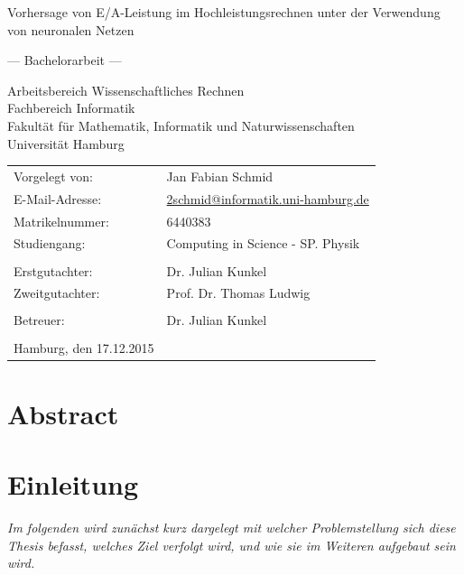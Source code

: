 \documentclass[
	12pt,
	a4paper,
	BCOR10mm,
	DIV14,
	listof=totoc,
	bibliography=totoc,
	headsepline
]{scrreprt}
\begin{document}
\begin{titlepage}
	\begin{center}
		{\titlefont\huge Vorhersage von E/A-Leistung im Hochleistungsrechnen unter der Verwendung von neuronalen Netzen\par}

		\bigskip
		\bigskip

		{\titlefont\Large --- Bachelorarbeit ---\par}

		\bigskip
		\bigskip

		{\large Arbeitsbereich Wissenschaftliches Rechnen\\
		Fachbereich Informatik\\
		Fakultät für Mathematik, Informatik und Naturwissenschaften\\
		Universität Hamburg\par}
	\end{center}

	\vfill

	{\large \begin{tabular}{ll}
		Vorgelegt von: & Jan Fabian Schmid \\
		E-Mail-Adresse: & \href{mailto:2schmid@informatik.uni-hamburg.de}{2schmid@informatik.uni-hamburg.de} \\
		Matrikelnummer: & 6440383 \\
		Studiengang: & Computing in Science - SP. Physik \\
		\\
		Erstgutachter: & Dr. Julian Kunkel \\
		Zweitgutachter: & Prof. Dr. Thomas Ludwig\\ \\
		Betreuer: & Dr. Julian Kunkel \\
		\\
		Hamburg, den 17.12.2015
	\end{tabular}\par}
\end{titlepage}

\chapter*{Abstract}

\thispagestyle{empty}


\tableofcontents

\chapter{Einleitung}
\label{Einleitung}
\textit{%
Im folgenden wird zunächst kurz dargelegt mit welcher Problemstellung sich diese Thesis befasst, welches Ziel verfolgt wird, und wie sie im Weiteren aufgebaut sein wird.
}
\bigskip
\end{document}
